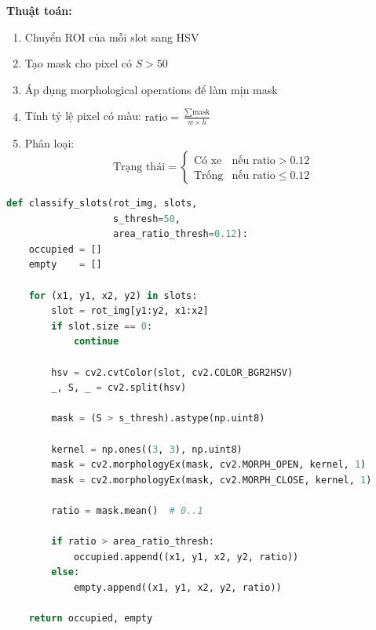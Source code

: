 \textbf{Thuật toán:}
\begin{enumerate}
    \item Chuyển ROI của mỗi slot sang HSV
    \item Tạo mask cho pixel có $S > 50$
    \item Áp dụng morphological operations để làm mịn mask
    \item Tính tỷ lệ pixel có màu: $\text{ratio} = \frac{\sum \text{mask}}{w \times h}$
    \item Phân loại:
    \begin{equation}
        \text{Trạng thái} = \begin{cases} 
        \text{Có xe} & \text{nếu ratio} > 0.12 \\
        \text{Trống} & \text{nếu ratio} \leq 0.12
        \end{cases}
    \end{equation}
\end{enumerate}
\begin{lstlisting}[language=Python]
def classify_slots(rot_img, slots,
                   s_thresh=50,
                   area_ratio_thresh=0.12):
    occupied = []
    empty    = []

    for (x1, y1, x2, y2) in slots:
        slot = rot_img[y1:y2, x1:x2]
        if slot.size == 0:
            continue

        hsv = cv2.cvtColor(slot, cv2.COLOR_BGR2HSV)
        _, S, _ = cv2.split(hsv)

        mask = (S > s_thresh).astype(np.uint8)

        kernel = np.ones((3, 3), np.uint8)
        mask = cv2.morphologyEx(mask, cv2.MORPH_OPEN, kernel, 1)
        mask = cv2.morphologyEx(mask, cv2.MORPH_CLOSE, kernel, 1)

        ratio = mask.mean()  # 0..1

        if ratio > area_ratio_thresh:
            occupied.append((x1, y1, x2, y2, ratio))
        else:
            empty.append((x1, y1, x2, y2, ratio))

    return occupied, empty
\end{lstlisting}
\cleardoublepage
